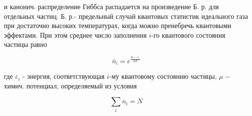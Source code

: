 \documentclass[10pt]{article}
\begin{document}
и канонич. распределение Гиббса распадается на произведение Б. р. для отдельных частиц. Б. р.- предельный случай квантовых статистик идеального газа при достаточно высоких температурах, когда можно пренебречь квантовыми эффектами. При этом среднее число заполнения $i$-го квантового состояния частицы равно



\[

\bar{n}_{i}=e^{\frac{\mu-\varepsilon_{i}}{k T}}

\]



где $\varepsilon_{i}$ - энергия, соответствующая $i$-му квантовому состоянию частицы, $\mu-$ химич. потенциал, определяемый из условия



\[

\sum_{i} n_{i}=N

\]
\end{document}
